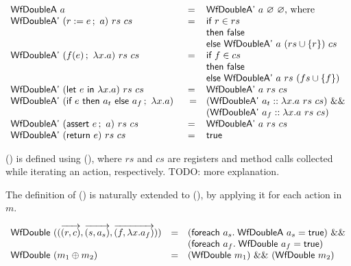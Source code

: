 \begin{definition}
  \label{def-wfdoublea}
  \mbox{}
  \begin{center}
    \begin{math}
      \begin{array}{lcl}
        \wfdoublea{a} & = & \wfdoubleap{a}{\emptyset}{\emptyset} \textrm{, where} \\
        \wfdoubleap{(\actwrite{r}{e}{a})}{rs}{cs} & = & \wordif{} r \in rs \\
        & & \wordthen{} \bfalse{} \\
        & & \wordelse{} \wfdoubleap{a}{(\setadd{rs}{r})}{cs} \\
        \wfdoubleap{(\actcall{x}{f}{e}{a})}{rs}{cs} & = & \wordif{} f \in cs \\
        & & \wordthen{} \bfalse{} \\
        & & \wordelse{} \wfdoubleap{a}{rs}{(\setadd{fs}{f})} \\
        \wfdoubleap{(\actlet{e}{x}{a})}{rs}{cs} & = & \wfdoubleap{a}{rs}{cs} \\
        \wfdoubleap{(\actifelse{e}{a_t}{a_f}{x}{a})} & =
        & (\wfdoubleap{\concataction{a_t}{a}}{rs}{cs})\ \band{} \\
        & & (\wfdoubleap{\concataction{a_f}{a}}{rs}{cs}) \\
        \wfdoubleap{(\actassert{e}{a})}{rs}{cs} & = & \wfdoubleap{a}{rs}{cs} \\
        \wfdoubleap{(\actret{e})}{rs}{cs} & = & \btrue{} \\
      \end{array}
    \end{math}
  \end{center}
\end{definition}

() is defined using (), where $rs$
and $cs$ are registers and method calls collected while iterating an
action, respectively. TODO: more explanation.

The definition of () is naturally extended to
(), by applying it for each action in $m$.

\begin{definition}
  \label{def-wfdouble}
  \mbox{}
  \begin{center}
    \begin{math}
      \begin{array}{lcl}
        \wfdouble{(\modbasic{\regpair{r}{c}}{\rulepair{s}{a_s}}{\methodpair{f}{\lambda x.a_f}})} & =
        & (\wordforeach{} a_s.\; \wfdoublea{a_s} = \btrue)\ \band{} \\
        & & (\wordforeach{} a_f.\; \wfdouble{a_f} = \btrue) \\
        \wfdouble{(\modcomp{m_1}{m_2})} & = & (\wfdouble{m_1})\ \band{}\ (\wfdouble{m_2}) \\
      \end{array}
    \end{math}
  \end{center}
\end{definition}

